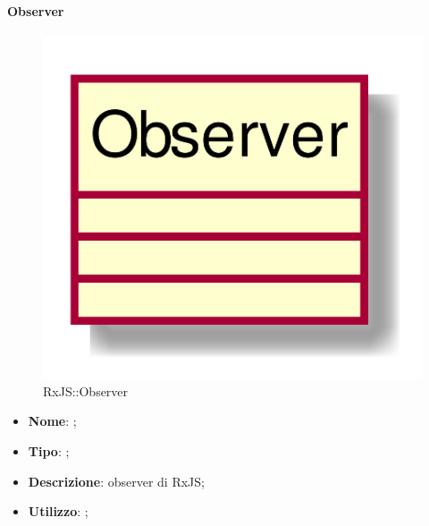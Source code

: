\hypertarget{Observer_label}{\paragraph{Observer}}
\begin{figure}[h]
	\centering
	\includegraphics[width=\textwidth,height=\textheight,keepaspectratio]{images/ClassObserver.png}
	\caption{RxJS::Observer}
\end{figure}
\begin{itemize}
	\item \textbf{Nome}: ;
	\item \textbf{Tipo}: ;
	\item \textbf{Descrizione}: observer di RxJS;
	\item \textbf{Utilizzo}: ;
\end{itemize}

